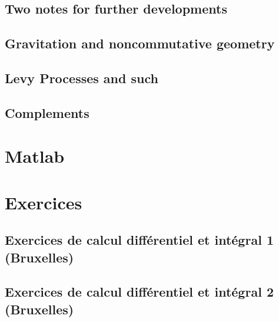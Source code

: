 \chapter{Two notes for further developments}        \label{ChapNoteDev}



\chapter{Gravitation and noncommutative geometry}


\chapter{Levy Processes and such}


\chapter{Complements}









\part{Matlab}




\part{Exercices} 





\chapter{Exercices de calcul différentiel et intégral 1 (Bruxelles)}


 
\chapter{Exercices de calcul différentiel et intégral 2 (Bruxelles)}






 


